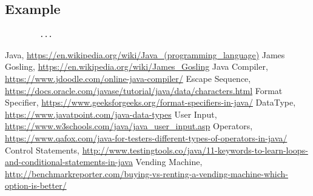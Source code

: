 \documentclass[openany]{book}  %
\begin{document}
% 
%
\subsection{Example}
\begin{center}
    \begin{verbatim}
        ...
    \end{verbatim}
\end{center}





















% 
% 
\printindex
% 
% 
\begin{thebibliography}{90}
    \footnotesize
     Java, \url{https://en.wikipedia.org/wiki/Java_(programming_language)}
     James Gosling, \url{https://en.wikipedia.org/wiki/James_Gosling}
     Java Compiler, \url{https://www.jdoodle.com/online-java-compiler/}
     Escape Sequence, \url{https://docs.oracle.com/javase/tutorial/java/data/characters.html}
     Format Specifier,  \footnotesize{\url{https://www.geeksforgeeks.org/format-specifiers-in-java/}}
     DataType, \url{https://www.javatpoint.com/java-data-types}
     User Input, \url{https://www.w3schools.com/java/java_user_input.asp}
     Operators, \url{https://www.qafox.com/java-for-testers-different-types-of-operators-in-java/}
     Control Statements, \url{http://www.testingtools.co/java/11-keywords-to-learn-loops-and-conditional-statements-in-java}
     Vending Machine, \url{http://benchmarkreporter.com/buying-vs-renting-a-vending-machine-which-option-is-better/}
\end{thebibliography}



















\end{document}
